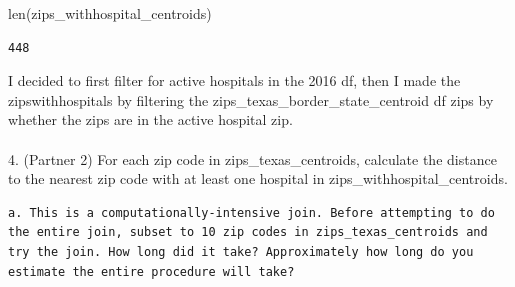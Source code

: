 \documentclass[
  letterpaper,
  DIV=11,
  numbers=noendperiod]{scrartcl}
\makeatletter
\let\oldparagraph\paragraph
\renewcommand{\paragraph}{
    \@ifstar
      \xxxParagraphStar
      \xxxParagraphNoStar
  }
\newcommand{\xxxParagraphStar}[1]{\oldparagraph*{#1}\mbox{}}
\newcommand{\xxxParagraphNoStar}[1]{\oldparagraph{#1}\mbox{}}
\newenvironment{Shaded}{\begin{snugshade}}{\end{snugshade}}
\newcommand{\BuiltInTok}[1]{\textcolor[rgb]{0.00,0.23,0.31}{#1}}
\newcommand{\NormalTok}[1]{\textcolor[rgb]{0.00,0.23,0.31}{#1}}
\makeatother
\begin{document}
\begin{Shaded}
\begin{Highlighting}[]
\BuiltInTok{len}\NormalTok{(zips\_withhospital\_centroids)}
\end{Highlighting}
\end{Shaded}

\begin{verbatim}
448
\end{verbatim}

I decided to first filter for active hospitals in the 2016 df, then I
made the zipswithhospitals by filtering the
zips\_texas\_border\_state\_centroid df zips by whether the zips are in
the active hospital zip.

\paragraph{4. (Partner 2) For each zip code in zips\_texas\_centroids,
calculate the distance to the nearest zip code with at least one
hospital in
zips\_withhospital\_centroids.}\label{partner-2-for-each-zip-code-in-zips_texas_centroids-calculate-the-distance-to-the-nearest-zip-code-with-at-least-one-hospital-in-zips_withhospital_centroids.}

\begin{verbatim}
a. This is a computationally-intensive join. Before attempting to do the entire join, subset to 10 zip codes in zips_texas_centroids and try the join. How long did it take? Approximately how long do you estimate the entire procedure will take?
\end{verbatim}
\end{document}
